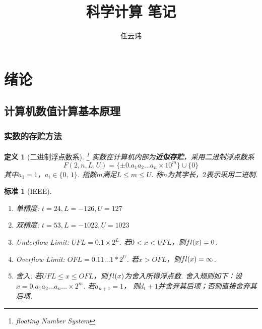 \documentclass[12pt, a4paper]{article}
\title{科学计算 笔记}
\author{任云玮}
\date{}
\theoremstyle{margin}
\newtheorem{defi}[thm]{定义}
\newtheorem{std}[thm]{标准}
\newcommand{\tbf}{\textbf}
\newcommand{\fl}{\mathnormal{fl}}
\newcommand{\aoneton}{a_1a_2\dots a_n}
\begin{document}
\maketitle
\tableofcontents
\newpage

\section{绪论}

\subsection{计算机数值计算基本原理}

\subsubsection{实数的存贮方法}
  \begin{defi}[二进制浮点数系]\footnote{floating Number System}
    实数在计算机内部为\tbf{近似存贮}，采用二进制浮点数系
    \[
      F(2,n,L,U)=\{\pm0.\aoneton\times10^m\}\cup\{0\}
    \]
    其中$a_1=1$，$a_i\in\{0,\,1\}$. 指数$m$满足$L\le m\le U$.
    称$n$为其字长，$2$表示采用二进制.
  \end{defi}

  \begin{std}[IEEE]
    $\,$
    \begin{enumerate}
      \item 单精度: $t=24,L=-126,U=127$
      \item 双精度: $t=53,L=-1022,U=1023$
      \item Underflow Limit: $UFL=0.1\times2^L$.
      若$0<x<UFL$，则$\\fl(x)=0$.
      \item Overflow Limit: $OFL=0.11\dots1*2^U$.
      若$x>OFL$，则$\fl(x)=\infty$.
      \item 舍入: 若$UFL\le x\le OFL$，则$\fl(x)$为舍入所得浮点数.
      舍入规则如下：设$x=0.\aoneton\dots\times2^m$. 若$a_{n+1}=1$，
      则$d_t+1$并舍弃其后项；否则直接舍弃其后项.
    \end{enumerate}
  \end{std}
\end{document}
